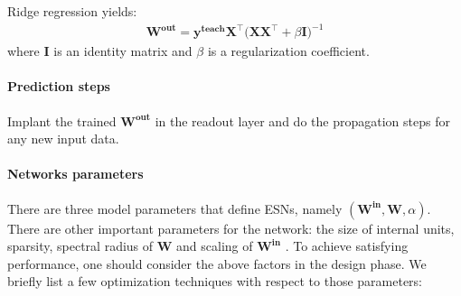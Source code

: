 \documentclass[a4paper,11pt,oneside]{article}
\begin{document}
Ridge regression yields:
\begin{align}
\mathbf{W^{out}} = \mathbf{y^{teach}X^\intercal (XX^\intercal } + \beta \mathbf{I})^{-1}
\end{align}
where $\mathbf{I}$ is an identity matrix and $\beta$ is a regularization coefficient. 

\paragraph{Prediction steps} Implant the trained $\mathbf{W^{out}}$ in the readout layer and do the propagation steps for any new input data. 
 
 \paragraph{Networks parameters} There are three model parameters that define ESNs, namely $(\mathbf{W^{in}, W}, \alpha )$. There are other important parameters for the network: the size of internal units, sparsity, spectral radius of $\mathbf{W}$ and scaling of $\mathbf{W^{in}}$ \cite{lukovsevivcius2012practical}. To achieve satisfying performance, one should consider the above factors in the design phase. We briefly list a few optimization techniques with respect to those parameters:
\end{document}
